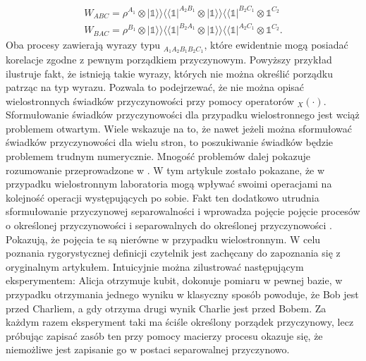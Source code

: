 \documentclass[10pt]{article} %
\newcommand{\BBra}[1]{\langle\langle#1|}
\newcommand{\KKet}[1]{|#1\rangle\rangle}
\newcommand{\I}{\mathbb{1}}
\begin{document}
\begin{gather}
W_{ABC} = \rho^{A_1} \otimes \KKet{\I}\BBra{\I}^{A_2B_1}\otimes \KKet{\I}\BBra{\I}^{B_2C_1} \otimes \I^{C_2} \\
W_{BAC} = \rho^{B_1} \otimes \KKet{\I}\BBra{\I}^{B_2A_1} \otimes \KKet{\I}\BBra{\I}^{A_2C_1} \otimes \I^{C_2}.
\end{gather} Oba procesy zawierają wyrazy typu ${}_{A_1A_2B_1B_2C_1}$, które ewidentnie mogą posiadać korelacje zgodne z pewnym porządkiem przyczynowym. Powyższy przykład ilustruje fakt, że istnieją takie wyrazy, których nie można określić porządku patrząc na typ wyrazu. Pozwala to podejrzewać, że nie można opisać wielostronnych świadków przyczynowości przy pomocy operatorów ${}_X(\cdot)$. Sformułowanie świadków przyczynowości dla przypadku wielostronnego jest wciąż problemem otwartym. Wiele wskazuje na to, że nawet jeżeli można sformułować świadków przyczynowości dla wielu stron, to poszukiwanie świadków będzie problemem trudnym numerycznie. Mnogość problemów dalej pokazuje rozumowanie przeprowadzone w \cite{mp_cs}. W tym artykule zostało pokazane, że w przypadku wielostronnym laboratoria mogą wpływać swoimi operacjami na kolejność operacji występujących po sobie. Fakt ten dodatkowo utrudnia sformułowanie przyczynowej separowalności i wprowadza pojęcie pojęcie procesów o określonej przyczynowości i separowalnych do określonej przyczynowości \cite{mp_cs}. Pokazują, że pojęcia te są nierówne w przypadku wielostronnym. W celu poznania rygorystycznej definicji czytelnik jest zachęcany do zapoznania się z oryginalnym artykułem. Intuicyjnie można zilustrować następującym eksperymentem: Alicja otrzymuje kubit, dokonuje pomiaru w pewnej bazie, w przypadku otrzymania jednego wyniku w klasyczny sposób powoduje, że Bob jest przed Charliem, a gdy otrzyma drugi wynik Charlie jest przed Bobem. Za każdym razem eksperyment taki ma ściśle określony porządek przyczynowy, lecz próbując zapisać zasób ten przy pomocy macierzy procesu okazuje się, że niemożliwe jest zapisanie go w postaci  separowalnej przyczynowo. 
 
\end{document}
